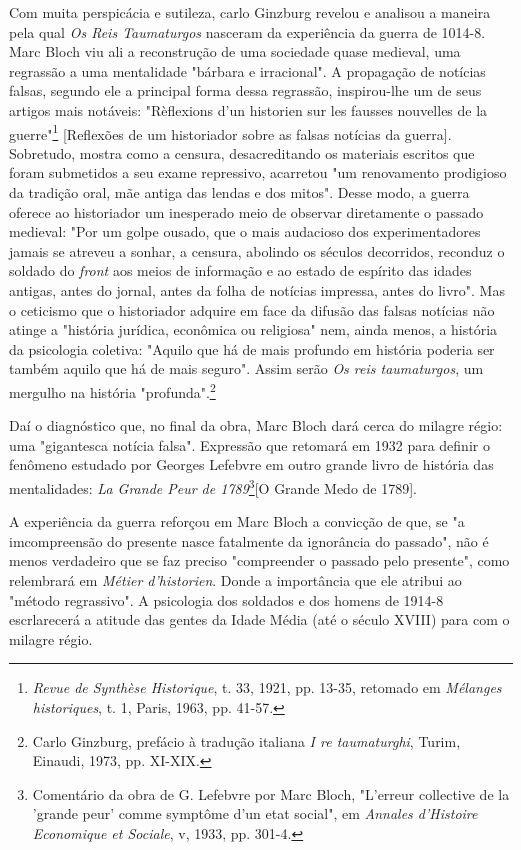 \documentclass[a5paper]{book}
\begin{document}
Com muita perspicácia e sutileza, carlo Ginzburg revelou e analisou a maneira pela qual \textit{Os Reis Taumaturgos} nasceram da experiência da guerra de 1014-8. Marc Bloch viu ali a reconstrução de uma sociedade quase medieval, uma regrassão a uma mentalidade "bárbara e irracional". A propagação de notícias falsas, segundo ele a principal forma dessa regrassão, inspirou-lhe um de seus artigos mais notáveis: "Rèflexions d'un historien sur les fausses nouvelles de la guerre"\footnote{\textit{Revue de Synthèse Historique}, t. 33, 1921, pp. 13-35, retomado em \textit{Mélanges historiques}, t. 1, Paris, 1963, pp. 41-57.} [Reflexões de um historiador sobre as falsas notícias da guerra]. Sobretudo, mostra como a censura, desacreditando os materiais escritos que foram submetidos a seu exame repressivo, acarretou "um renovamento prodigioso da tradição oral, mãe antiga das lendas e dos mitos". Desse modo, a guerra oferece ao historiador um inesperado meio de observar diretamente o passado medieval: "Por um golpe ousado, que o mais audacioso dos experimentadores jamais se atreveu a sonhar, a censura, abolindo os séculos decorridos, reconduz o soldado do \textit{front} aos meios de informação e ao estado de espírito das idades antigas, antes do jornal, antes da folha de notícias impressa, antes do livro". Mas o ceticismo que o historiador adquire em face da difusão das falsas notícias não atinge a "história jurídica, econômica ou religiosa" nem, ainda menos, a história da psicologia coletiva: "Aquilo que há de mais profundo em história poderia ser também aquilo que há de mais seguro". Assim serão \textit{Os reis taumaturgos}, um mergulho na história "profunda".\footnote{Carlo Ginzburg, prefácio à tradução italiana \textit{I re taumaturghi}, Turim, Einaudi, 1973, pp. XI-XIX.}

Daí o diagnóstico que, no final da obra, Marc Bloch dará cerca do milagre régio: uma "gigantesca notícia falsa". Expressão que retomará em 1932 para definir o fenômeno estudado por Georges Lefebvre em outro grande livro de história das mentalidades: \textit{La Grande Peur de 1789}\footnote{Comentário da obra de G. Lefebvre por Marc Bloch, "L'erreur collective de la 'grande peur' comme symptôme d'un etat social", em \textit{Annales d'Histoire Economique et Sociale}, v, 1933, pp. 301-4.}[O Grande Medo de 1789].

A experiência da guerra reforçou em Marc Bloch a convicção de que, se "a imcompreensão do presente nasce fatalmente da ignorância do passado", não é menos verdadeiro que se faz preciso "compreender o passado pelo presente", como relembrará em \textit{Métier d'historien}. Donde a importância que ele atribui ao "método regrassivo". A psicologia dos soldados e dos homens de 1914-8 escrlarecerá a atitude das gentes da Idade Média (até o século XVIII) para com o milagre régio.
\end{document}
